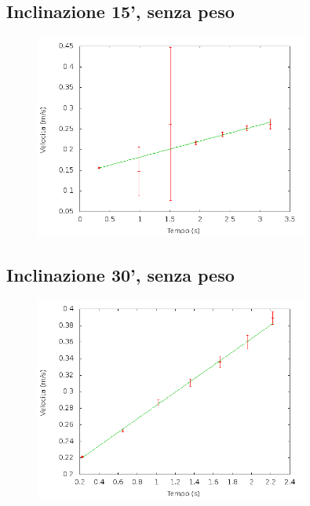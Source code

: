\documentclass[12pt]{article} %
\begin{document}
	\subsection{Inclinazione 15', senza peso}
	\begin{figure}[H]
		\centering
		\includegraphics[width=0.8\textwidth]{velocita_15gradi_normale}
		\label{fig:15n}
	\end{figure}
 
	\subsection {Inclinazione 30', senza peso}
	\begin{figure}[H]
		\centering
		\includegraphics[width=0.8\textwidth]{velocita_30gradi_normale}
		\label{fig:30n}
	\end{figure}
	
\end{document}
